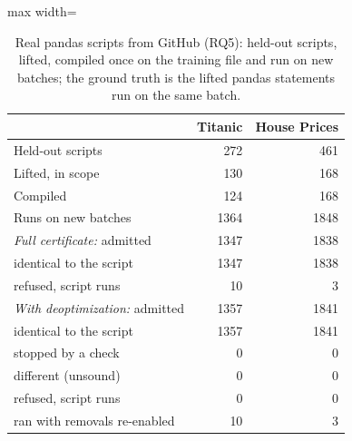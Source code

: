 \begin{table}[t]
\caption{Real pandas scripts from GitHub (RQ5): held-out scripts, lifted, compiled once on the training file and run on new batches; the ground truth is the lifted pandas statements run on the same batch.}
\label{tab:rq-corpus}
\centering
\footnotesize
\begin{adjustbox}{max width=\linewidth}
\begin{tabular}{@{}lrr@{}}
\toprule
& Titanic & House Prices \\
\midrule
Held-out scripts & 272 & 461 \\
Lifted, in scope & 130 & 168 \\
Compiled & 124 & 168 \\
Runs on new batches & 1364 & 1848 \\
\emph{Full certificate:} admitted & 1347 & 1838 \\
\quad identical to the script & 1347 & 1838 \\
\quad refused, script runs & 10 & 3 \\
\emph{With deoptimization:} admitted & 1357 & 1841 \\
\quad identical to the script & 1357 & 1841 \\
\quad stopped by a check & 0 & 0 \\
\quad different (unsound) & 0 & 0 \\
\quad refused, script runs & 0 & 0 \\
\quad ran with removals re-enabled & 10 & 3 \\
\bottomrule
\end{tabular}
\end{adjustbox}
\end{table}
